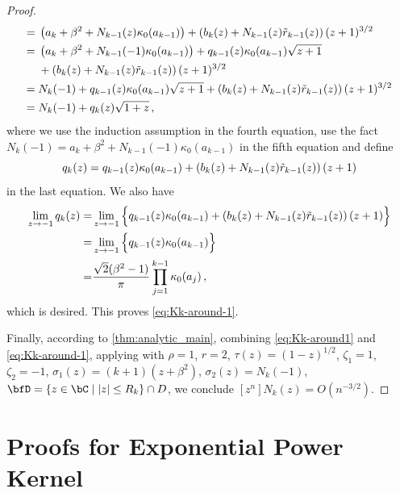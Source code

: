 \documentclass[11pt]{article}
\begin{document}
\begin{proof}
\begin{align*}
    ={}& \left(a_k+\beta^2+N_{k-1}(z)\kappa_0(a_{k-1})\right)+\left( b_k(z)+N_{k-1}(z)\Tilde{r}_{k-1}(z) \right)(z+1)^{3/2}\\
    ={}& \left(a_k+\beta^2+N_{k-1}(-1)\kappa_0(a_{k-1})\right)+q_{k-1}(z)\kappa_0(a_{k-1})\sqrt{z+1}\\
    &+\left( b_k(z)+N_{k-1}(z)\Tilde{r}_{k-1}(z) \right)(z+1)^{3/2}\\
    ={}& N_k(-1)+q_{k-1}(z)\kappa_0(a_{k-1})\sqrt{z+1}+\left( b_k(z)+N_{k-1}(z)\Tilde{r}_{k-1}(z) \right)(z+1)^{3/2}\\
    ={}& N_k(-1) + q_k(z)\sqrt{1+z}\,,
\end{align*}
where we use the induction assumption in the fourth equation, use the fact $N_k(-1)=a_k+\beta^2+N_{k-1}(-1)\kappa_0(a_{k-1})$ in the fifth equation and define \[q_k(z)=q_{k-1}(z)\kappa_0(a_{k-1})+\left( b_k(z)+N_{k-1}(z)\Tilde{r}_{k-1}(z) \right)(z+1)\] in the last equation. We also have 
\begin{align*}
    \lim_{z\to -1} q_k(z)=&\lim_{z\to -1}\Big\{q_{k-1}(z)\kappa_0(a_{k-1})+\left( b_k(z)+N_{k-1}(z)\Tilde{r}_{k-1}(z) \right)(z+1)\Big\}\\
    =&\lim_{z\to -1}\Big\{q_{k-1}(z)\kappa_0(a_{k-1})\Big\}\\
    =&\frac{\sqrt{2}(\beta^2-1)}{\pi}\prod_{j=1}^{k-1}\kappa_0(a_j)\,,
\end{align*}
which is desired. This proves \eqref{eq:Kk-around-1}.


Finally, according to \cref{thm:analytic_main}, combining \eqref{eq:Kk-around1} and \eqref{eq:Kk-around-1}, applying 
 \cite[Theorem VI.5]{flajolet2009analytic} with $\rho=1$, $r=2$, $\tau(z) = (1-z)^{1/2}$, $\zeta_1=1$, $\zeta_2=-1$, $\sigma_1(z) = (k+1)(z+\beta^2)$, $\sigma_2(z) = N_k(-1)$, $\bfD = \{z\in \bC\mid |z|\le R_k\}\cap D$,
we conclude $[z^n]N_k(z) = O(n^{-3/2})$. 
\end{proof}



\section{Proofs for Exponential Power Kernel}
\end{document}
